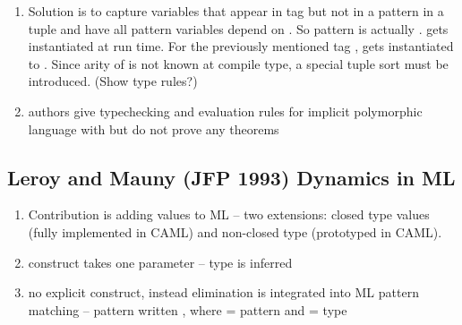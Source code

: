 \documentclass[12pt]{article}	%
\begin{document}
\begin{enumerate}
	\item Solution is to capture variables that appear in tag but not in a pattern in a tuple  and have all pattern variables depend on . So pattern  is actually  .  gets instantiated at run time. For the previously mentioned tag ,  gets instantiated to . Since arity of  is not known at compile type, a special tuple sort must be introduced. (Show type rules?)
	\item authors give typechecking and evaluation rules for implicit polymorphic language with \Dynamic but do not prove any theorems
	
	
\end{enumerate}

\subsection*{Leroy and Mauny (JFP 1993) Dynamics in ML}
\begin{enumerate}
	\item Contribution is adding \Dynamic values to ML -- two extensions: closed type \Dynamic values (fully implemented in CAML) and non-closed type (prototyped in CAML).
	\item \dynamic construct takes one parameter -- type is inferred
	\item no explicit \typecase construct, instead \Dynamic elimination is integrated into ML pattern matching -- pattern written , where  = pattern and  = type
\end{enumerate}
\end{document}
